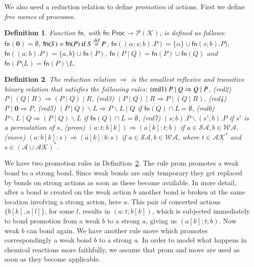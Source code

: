 \documentclass[preprint,12pt]{elsarticle}
\newcommand{\paral}{\; \vert \;}
\newcommand{\Proc}{\mathsf{Proc}}
\newcommand{\Par}{\mid}
\newcommand{\restrict}[1]{\!\setminus\!#1}
\newcommand{\mA}{\mathcal{A}}
\newcommand{\mAK}{\mathcal{AK}}
\newcommand{\rom}[1]{\mbox{\rm{#1}}}
\newcommand{\Nil}{\mathbf{0}}
\newcommand{\Keys}{\mathcal{K}}
\newcommand{\bydef}{\stackrel{\emph{def}}{=}}
\newtheorem{definition}{Definition}
\begin{document}
We also need a reduction relation to define \emph{promotion} of actions. 
First we define {\em free names} of processes.

\begin{definition} \normalfont 
Function $\mathsf{fn}$, with $\mathsf{fn}: \Proc \rightarrow \mathcal{P}(\Keys)$, is defined as follows: $\mathsf{fn}(\Nil) = \emptyset$, $\mathsf{fn}(S)=\mathsf{fn}(P) \text{ if }  S\bydef P$, $\mathsf{fn}((\alpha : s;b).P)=\{\alpha\} \cup \mathsf{fn}(s;b).P)$, $\mathsf{fn}((a;b).P)=\{a,b\} \cup \mathsf{fn}(P) $, $\mathsf{fn}(P\paral Q)=\mathsf{fn}(P) \cup \mathsf{fn}(Q)$ and $\mathsf{fn}(P \restrict L)=\mathsf{fn}(P) \restrict L$.
\end{definition}

\begin{definition}\label{def:reduction}{\rm The reduction relation $\Rightarrow$ is the smallest 
reflexive and transitive binary relation that satisfies the following rules: 
$(\rom{red1})\; P\Par Q \Rightarrow Q\Par P$, (\rom{red2})\; $P\Par (Q\Par R) \Rightarrow 
(P\Par Q)\Par R$, (\rom{red3})\; $(P\Par Q)\Par R \Rightarrow P\Par (Q\Par R)$, (\rom{red4})\;
$P\Par \Nil \Rightarrow P$, (\rom{red5})\; $(P\paral Q)\backslash L \Rightarrow P\backslash L 
\paral Q$  if $\mathsf{fn}(Q) \cap L = \emptyset$, (\rom{red6})\; $P\backslash L \paral Q \Rightarrow 
(P\paral Q)\backslash L$  if $\mathsf{fn}(Q) \cap L = \emptyset$, (\rom{red7})\; $(s;b).P 
\backslash (s';b).P$ if $s'$ is a permutation of $s$, (\rom{prom})\; 
$(a:t;b[k]) \Rightarrow (a[k]:t;b)$ if $a \in \mathcal{SA}, b \in \mathcal{WA}$, 
(\rom{move})\; $(a:b[k]:s) \Rightarrow (a[k]:b:s)$ if  
$a \in \mathcal{SA}, b \in \mathcal{WA}$, where $t\in \mAK^*$ and $s\in (\mA \cup \mAK)^*$.
}
\end{definition}
%
We have two promotion rules in Definition~\ref{def:reduction}. The rule prom
promotes a weak bond to a strong bond. Since weak bonds are only temporary they get replaced by bonds 
on strong actions as soon as these become available. In more detail, after a bond is created on the
weak action $b$ another bond is broken at the same location involving a strong action, here $a$.  
This pair of concerted actions $\{b[k],a[l]\}$, for some $l$, results in $(a:t;b[k])$, which is
subjected immediately to bond promotion from a weak $b$ to a strong $a$, giving us $(a[k]:t;b)$.
Now weak $b$ can bond again. We have another rule move which promotes correspondingly 
a weak bond $b$ to a strong $a$.
In order to model what happens in chemical reactions more faithfully, we assume that prom and move
are used as soon as they become applicable.
\end{document}
